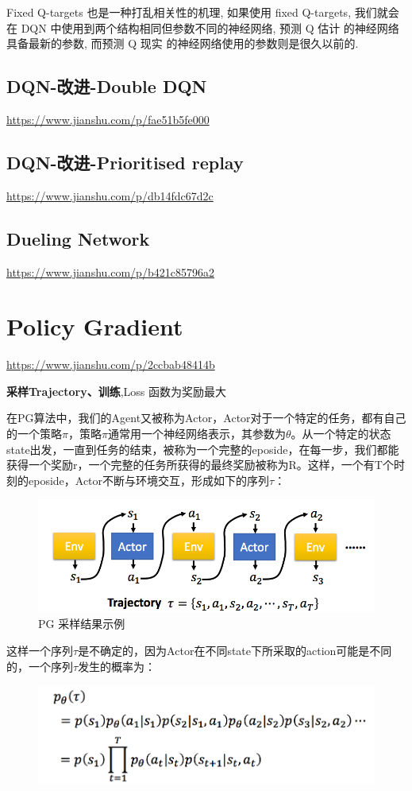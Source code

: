 \documentclass[UTF8,a4paper,12pt]{ctexbook}
\begin{document}
			Fixed Q-targets 也是一种打乱相关性的机理, 如果使用 fixed Q-targets, 我们就会在 DQN 中使用到两个结构相同但参数不同的神经网络, 预测 Q 估计 的神经网络具备最新的参数, 而预测 Q 现实 的神经网络使用的参数则是很久以前的. 
		
		
		\subsection{DQN-改进-Double DQN}
			\url{https://www.jianshu.com/p/fae51b5fe000}
			
		\subsection{DQN-改进-Prioritised replay}
			\url{https://www.jianshu.com/p/db14fdc67d2c}
			
		\subsection{Dueling Network}
			\url{https://www.jianshu.com/p/b421c85796a2}
	
	
	
	
	\section{Policy Gradient}
		\url{https://www.jianshu.com/p/2ccbab48414b}
		
		\textbf{采样Trajectory、训练},Loss 函数为奖励最大
		
		在PG算法中，我们的Agent又被称为Actor，Actor对于一个特定的任务，都有自己的一个策略$\pi$，策略$\pi$通常用一个神经网络表示，其参数为$\theta$。从一个特定的状态state出发，一直到任务的结束，被称为一个完整的eposide，在每一步，我们都能获得一个奖励r，一个完整的任务所获得的最终奖励被称为R。这样，一个有T个时刻的eposide，Actor不断与环境交互，形成如下的序列$\tau$：
		\begin{figure}[H]
		\centering
		\includegraphics[width=.9\linewidth]{PG01}
		\caption{PG 采样结果示例}
		\end{figure}
		
		这样一个序列$\tau$是不确定的，因为Actor在不同state下所采取的action可能是不同的，一个序列$\tau$发生的概率为：
		\begin{figure}[H]
		\centering
		\includegraphics[width=.8\linewidth]{PG02}
		\end{figure}		
		
\end{document}
